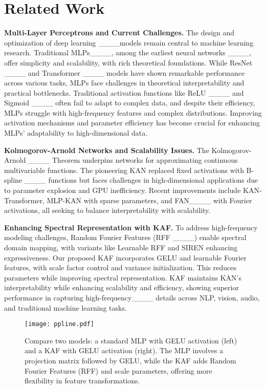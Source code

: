 \section{Related Work}
\textbf{Multi-Layer Perceptrons and Current Challenges.} The design and optimization of deep learning ____models remain central to machine learning research. Traditional MLPs____, among the earliest neural networks ____, offer simplicity and scalability, with rich theoretical foundations. While ResNet ____ and Transformer ____ models have shown remarkable performance across various tasks, MLPs face challenges in theoretical interpretability and practical bottlenecks. Traditional activation functions like ReLU ____ and Sigmoid ____ often fail to adapt to complex data, and despite their efficiency, MLPs struggle with high-frequency features and complex distributions. Improving activation mechanisms and parameter efficiency has become crucial for enhancing MLPs' adaptability to high-dimensional data.

\textbf{Kolmogorov-Arnold Networks and Scalability Issues.} The Kolmogorov-Arnold ____ Theorem underpins networks for approximating continuous multivariable functions. The pioneering KAN replaced fixed activations with B-spline ____ functions but faces challenges in high-dimensional applications due to parameter explosion and GPU inefficiency. Recent improvements include KAN-Transformer, MLP-KAN with sparse parameters, and FAN____ with Fourier activations, all seeking to balance interpretability with scalability.

\textbf{Enhancing Spectral Representation with KAF.} To address high-frequency modeling challenges, Random Fourier Features (RFF ____) enable spectral domain mapping, with variants like Learnable RFF and SIREN enhancing expressiveness. Our proposed KAF incorporates GELU and learnable Fourier features, with scale factor control and variance initialization. This reduces parameters while improving spectral representation. KAF maintains KAN's interpretability while enhancing scalability and efficiency, showing superior performance in capturing high-frequency____ details across NLP, vision, audio, and traditional machine learning tasks.
\begin{figure*}[t]  %
    \centering
    \texttt{[image: ppline.pdf]}  %
    \vspace{-20pt}
    \caption{Compare two models: a standard MLP with GELU activation (left) and a KAF with GELU activation (right). The MLP involves a projection matrix followed by GELU, while the KAF adds Random Fourier Features (RFF) and scale parameters, offering more flexibility in feature transformations.}
    \label{fig:pipeline}
\end{figure*}
